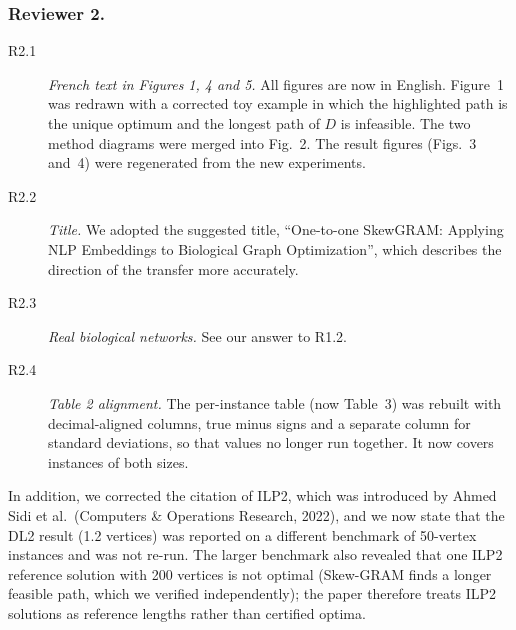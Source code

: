 \subsubsection{Reviewer 2.}

\begin{description}
\item[R2.1] \emph{French text in Figures 1, 4 and 5.} All figures are now in English. Figure~1 was redrawn with a corrected toy example in which the highlighted path is the unique optimum and the longest path of $D$ is infeasible. The two method diagrams were merged into Fig.~2. The result figures (Figs.~3 and~4) were regenerated from the new experiments.

\item[R2.2] \emph{Title.} We adopted the suggested title, ``One-to-one SkewGRAM: Applying NLP Embeddings to Biological Graph Optimization'', which describes the direction of the transfer more accurately.

\item[R2.3] \emph{Real biological networks.} See our answer to R1.2.

\item[R2.4] \emph{Table 2 alignment.} The per-instance table (now Table~3) was rebuilt with decimal-aligned columns, true minus signs and a separate column for standard deviations, so that values no longer run together. It now covers instances of both sizes.
\end{description}

In addition, we corrected the citation of ILP2, which was introduced by Ahmed Sidi et al.\ (Computers \& Operations Research, 2022), and we now state that the DL2 result (1.2 vertices) was reported on a different benchmark of 50-vertex instances and was not re-run. The larger benchmark also revealed that one ILP2 reference solution with 200 vertices is not optimal (Skew-GRAM finds a longer feasible path, which we verified independently); the paper therefore treats ILP2 solutions as reference lengths rather than certified optima.

